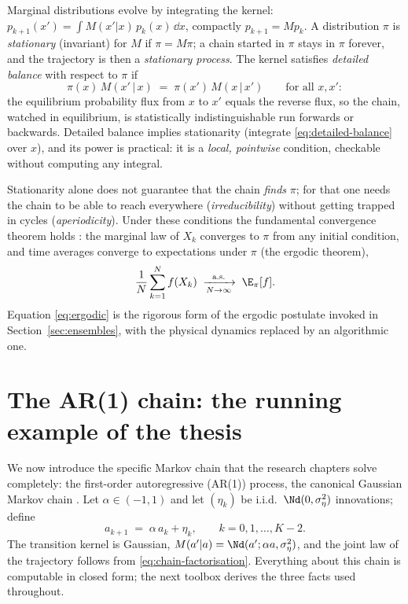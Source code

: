 Marginal distributions evolve by integrating the kernel:
$p_{k+1}(x') = \int M(x'|x)\, p_k(x)\,\dd x$, compactly $p_{k+1} = M p_k$.
A distribution $\pi$ is \emph{stationary} (invariant) for $M$ if
$\pi = M\pi$; a chain started in $\pi$ stays in $\pi$ forever, and the
trajectory is then a \emph{stationary process}. The kernel satisfies
\emph{detailed balance} with respect to $\pi$ if
\begin{equation}
  \pi(x)\, M(x' \,|\, x) \;=\; \pi(x')\, M(x \,|\, x')
  \qquad \text{for all } x, x' :
  \label{eq:detailed-balance}
\end{equation}
the equilibrium probability flux from $x$ to $x'$ equals the reverse flux,
so the chain, watched in equilibrium, is statistically indistinguishable run
forwards or backwards. Detailed balance implies stationarity (integrate
\eqref{eq:detailed-balance} over $x$), and its power is practical: it is a
\emph{local, pointwise} condition, checkable without computing any integral.

Stationarity alone does not guarantee that the chain \emph{finds} $\pi$; for
that one needs the chain to be able to reach everywhere
(\emph{irreducibility}) without getting trapped in cycles
(\emph{aperiodicity}). Under these conditions the fundamental convergence
theorem holds \citep{robert2004monte}: the marginal law of $X_k$ converges
to $\pi$ from any initial condition, and time averages converge to
expectations under $\pi$ (the ergodic theorem),
\begin{equation}
  \frac{1}{N} \sum_{k=1}^{N} f(X_k)
  \;\xrightarrow[N \to \infty]{\text{a.s.}}\;
  \E_\pi[f] .
  \label{eq:ergodic}
\end{equation}
Equation \eqref{eq:ergodic} is the rigorous form of the ergodic postulate
invoked in Section~\ref{sec:ensembles}, with the physical dynamics replaced
by an algorithmic one.

\section{The AR(1) chain: the running example of the thesis}\label{sec:ar1}

We now introduce the specific Markov chain that the research chapters solve
completely: the first-order autoregressive (AR(1)) process, the canonical
Gaussian Markov chain \citep{brockwell1991time}. Let
$\alpha \in (-1, 1)$ and let $(\eta_k)$ be i.i.d.\ $\Nd(0, \sigma_\eta^2)$
innovations; define
\begin{equation}
  a_{k+1} \;=\; \alpha\, a_k + \eta_k ,
  \qquad k = 0, 1, \dots, K-2 .
  \label{eq:ar1}
\end{equation}
The transition kernel is Gaussian,
$M(a' | a) = \Nd(a'; \alpha a, \sigma_\eta^2)$, and the joint law of the
trajectory follows from \eqref{eq:chain-factorisation}. Everything about
this chain is computable in closed form; the next toolbox derives the three
facts used throughout.

